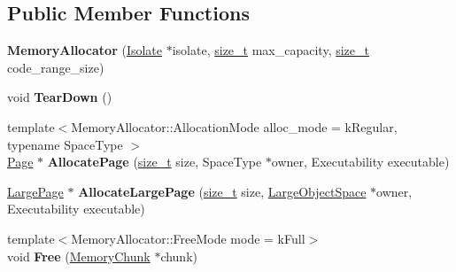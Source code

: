 \subsection*{Public Member Functions}
\begin{DoxyCompactItemize}
\item 
\mbox{\label{classv8_1_1internal_1_1MemoryAllocator_ae3f0cab8f80c404fb92b41ef676a6ebc}} 
{\bfseries Memory\+Allocator} (\mbox{\hyperlink{classv8_1_1internal_1_1Isolate}{Isolate}} $\ast$isolate, \mbox{\hyperlink{classsize__t}{size\+\_\+t}} max\+\_\+capacity, \mbox{\hyperlink{classsize__t}{size\+\_\+t}} code\+\_\+range\+\_\+size)
\item 
\mbox{\label{classv8_1_1internal_1_1MemoryAllocator_a41d0347f476400e5b35fb9f40081471c}} 
void {\bfseries Tear\+Down} ()
\item 
\mbox{\label{classv8_1_1internal_1_1MemoryAllocator_a4828039863fa25890cb7efaa3f53126a}} 
{\footnotesize template$<$Memory\+Allocator\+::\+Allocation\+Mode alloc\+\_\+mode = k\+Regular, typename Space\+Type $>$ }\\\mbox{\hyperlink{classv8_1_1internal_1_1Page}{Page}} $\ast$ {\bfseries Allocate\+Page} (\mbox{\hyperlink{classsize__t}{size\+\_\+t}} size, Space\+Type $\ast$owner, Executability executable)
\item 
\mbox{\label{classv8_1_1internal_1_1MemoryAllocator_a8386866a8e8e6b0d463cc2508dc59b44}} 
\mbox{\hyperlink{classv8_1_1internal_1_1LargePage}{Large\+Page}} $\ast$ {\bfseries Allocate\+Large\+Page} (\mbox{\hyperlink{classsize__t}{size\+\_\+t}} size, \mbox{\hyperlink{classv8_1_1internal_1_1LargeObjectSpace}{Large\+Object\+Space}} $\ast$owner, Executability executable)
\item 
\mbox{\label{classv8_1_1internal_1_1MemoryAllocator_a45142bb4bfeef4b6970fc23bdfa286a4}} 
{\footnotesize template$<$Memory\+Allocator\+::\+Free\+Mode mode = k\+Full$>$ }\\void {\bfseries Free} (\mbox{\hyperlink{classv8_1_1internal_1_1MemoryChunk}{Memory\+Chunk}} $\ast$chunk)
\item 
\mbox{\label{classv8_1_1internal_1_1MemoryAllocator_ab11215af5deaa0644edcd30e0b71d4ce}} 

\end{DoxyCompactItemize}
